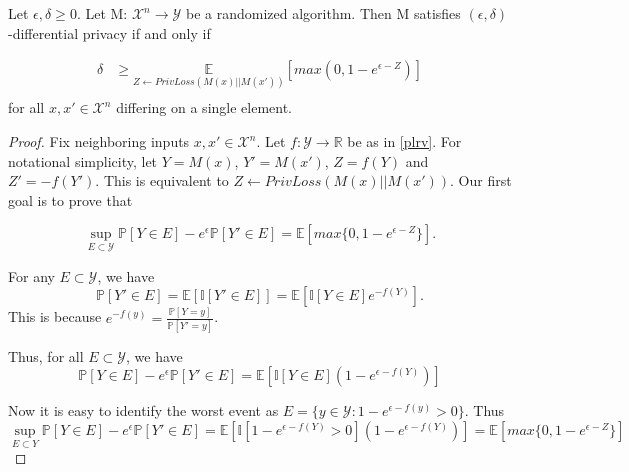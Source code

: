 \documentclass{article}
\begin{document}
\begin{lemma}
\label{delta-bound}
\cite{CKS20} Let $\epsilon, \delta \geq 0$. Let M: $\mathcal{X}^n \rightarrow \mathcal{Y}$ be a randomized algorithm. Then M satisfies $(\epsilon, \delta)$-differential privacy if and only if

\begin{align}
    \delta &\geq \underset{Z \leftarrow PrivLoss(M(x)|| M(x'))}{\mathbb{E}} [max(0, 1 - e^{\epsilon - Z})] \\
\end{align}
for all $x, x' \in \mathcal{X}^n$ differing on a single element.

\begin{proof}
Fix neighboring inputs $x, x' \in \mathcal{X}^n$.
Let $f: \mathcal{Y} \rightarrow \mathbb{R}$ be as in \ref{plrv}.
For notational simplicity, let $Y = M(x)$, $Y' = M(x')$, $Z = f(Y)$ and $Z' = -f(Y')$.
This is equivalent to $Z \leftarrow PrivLoss(M(x) || M(x'))$.
Our first goal is to prove that

\begin{equation}
    \sup\limits_{E \subset \mathcal{Y}} \mathbb{P}[Y \in E] - e^\epsilon \mathbb{P}[Y' \in E] = \mathbb{E}[max\{0, 1 - e^{\epsilon - Z}\}].
\end{equation}

For any $E \subset \mathcal{Y}$, we have
\begin{equation}
    \mathbb{P}[Y' \in E] = \mathbb{E}[\mathbb{I}[Y' \in E]] = \mathbb{E}[\mathbb{I}[Y \in E] e^{-f(Y)}].
\end{equation}
This is because $e^{-f(y)} = \frac{\mathbb{P}[Y=y]}{\mathbb{P}[Y'=y]}$.

Thus, for all $E \subset \mathcal{Y}$, we have
\begin{equation}
    \mathbb{P}[Y \in E] - e^\epsilon \mathbb{P}[Y' \in E] = \mathbb{E} \left[ \mathbb{I}[Y \in E] (1 - e^{\epsilon - f(Y)}) \right]
\end{equation}

Now it is easy to identify the worst event as $E = \{y \in \mathcal{Y} : 1 - e^{\epsilon - f(y)} > 0\}$. Thus
\begin{equation}
    \sup\limits_{E \subset Y} \mathbb{P}[Y \in E] - e^{\epsilon} \mathbb{P}[Y' \in E] = \mathbb{E} \left[ \mathbb{I}[1 - e^{\epsilon - f(Y)} > 0] (1 - e^{\epsilon - f(Y)}) \right] = \mathbb{E}[max\{ 0, 1 - e^{\epsilon - Z} \}]
\end{equation}


\end{proof}
\end{lemma}
\end{document}
